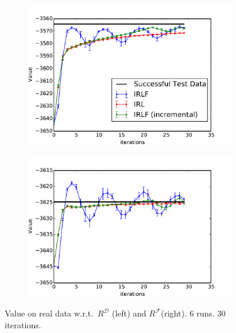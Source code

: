 \documentclass[letterpaper]{article}
\begin{document}
\begin{figure}[t]
  \begin{subfigure}[b]{0.495\columnwidth}
    \includegraphics[trim=0.5cm 0.5cm 0.2cm 0.2,clip=true,width=\textwidth]{images/expert_apprentice_real.pdf}
    \label{fig:real_expert_apprentice}
  \end{subfigure}
  \begin{subfigure}[b]{0.495\columnwidth}
    \includegraphics[trim=0.5cm 0.5cm 0.2cm 0.2,clip=true,width=\textwidth]{images/taboo_apprentice_real.pdf}
    \label{fig:real_taboo_apprentice}
  \end{subfigure}  
  \vspace{-8mm}
  \caption{\small{Value on real data w.r.t.\ $R^\mathcal{D}$ (left) and $R^\mathcal{F}$(right). 6 runs. 30 iterations.}}
  \vspace{-4mm}
  \label{fig:real_data}
\end{figure}
\end{document}
